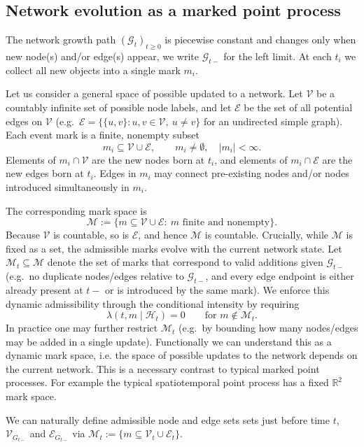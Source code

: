 \documentclass[12pt]{article}
\begin{document}
\subsection{Network evolution as a marked point process}\label{sec:mpp_updates}

The network growth path $(\mathcal G_t)_{t\ge 0}$ is piecewise constant and changes only when new node(s) and/or edge(s) appear, we write $\mathcal G_{t-}$ for the left limit. At each $t_i$ we collect all new objects into a single mark $m_i$.

Let us consider a general space of possible updated to a network. Let $\mathcal V$ be a countably infinite set of possible node labels, and let $\mathcal E$ be the set of all potential edges on $\mathcal V$ (e.g.\ $\mathcal E=\{\{u,v\}:u,v\in\mathcal V,\ u\neq v\}$ for an undirected simple graph). Each event mark is a finite, nonempty subset
\[
m_i \subseteq \mathcal V \cup \mathcal E,
\qquad m_i\neq \emptyset,\quad |m_i|<\infty.
\]
Elements of $m_i\cap\mathcal V$ are the new nodes born at $t_i$, and elements of $m_i\cap\mathcal E$ are the new edges born at $t_i$. Edges in $m_i$ may connect pre-existing nodes and/or nodes introduced simultaneously in $m_i$.

The corresponding mark space is
\[
\mathcal M := \bigl\{m\subseteq \mathcal V\cup\mathcal E:\ m\text{ finite and nonempty}\bigr\}.
\]
Because $\mathcal V$ is countable, so is $\mathcal E$, and hence $\mathcal M$ is countable. Crucially, while $\mathcal M$ is fixed as a set, the admissible marks evolve with the current network state. Let $\mathcal M_t\subseteq\mathcal M$ denote the set of marks that correspond to valid additions given $\mathcal G_{t-}$ (e.g.\ no duplicate nodes/edges relative to $\mathcal G_{t-}$, and every edge endpoint is either already present at $t-$ or is introduced by the same mark). We enforce this dynamic admissibility through the conditional intensity by requiring
\[
\lambda(t,m\mid\mathcal H_t)=0 \qquad \text{for } m\notin \mathcal M_t.
\]
In practice one may further restrict $\mathcal M_t$ (e.g.\ by bounding how many nodes/edges may be added in a single update). Functionally we can understand this as a dynamic mark space, i.e. the space of possible updates to the network depends on the current network. This is a necessary contrast to typical marked point processes. For example the typical spatiotemporal point process has a fixed $\mathbb{R}^{2}$ mark space.

We can naturally define admissible node and edge sets sets just before time $t$, $\mathcal V_{G_{t-}}$ and $\mathcal E_{G_{t-}}$ via $\mathcal M_t := \bigl\{m\subseteq \mathcal V_t\cup\mathcal E_t \bigr\}$.
\end{document}

